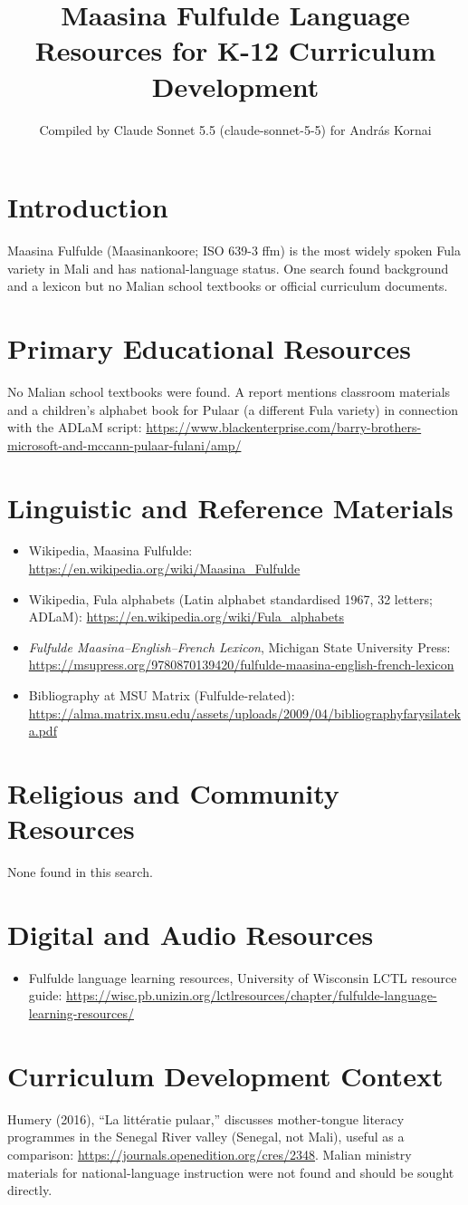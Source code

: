 \documentclass[12pt]{article}
\title{Maasina Fulfulde Language Resources for K-12 Curriculum Development}
\author{Compiled by Claude Sonnet 5.5 (claude-sonnet-5-5) for Andr\'as Kornai}
\date{}
\begin{document}
\maketitle
\section{Introduction}
Maasina Fulfulde (Maasinankoore; ISO 639-3 ffm) is the most widely spoken Fula variety in Mali and has national-language status. One search found background and a lexicon but no Malian school textbooks or official curriculum documents.
\section{Primary Educational Resources}
No Malian school textbooks were found. A report mentions classroom materials and a children's alphabet book for Pulaar (a different Fula variety) in connection with the ADLaM script: \url{https://www.blackenterprise.com/barry-brothers-microsoft-and-mccann-pulaar-fulani/amp/}
\section{Linguistic and Reference Materials}
\begin{itemize}
\item Wikipedia, Maasina Fulfulde: \url{https://en.wikipedia.org/wiki/Maasina_Fulfulde}
\item Wikipedia, Fula alphabets (Latin alphabet standardised 1967, 32 letters; ADLaM): \url{https://en.wikipedia.org/wiki/Fula_alphabets}
\item \textit{Fulfulde Maasina--English--French Lexicon}, Michigan State University Press: \url{https://msupress.org/9780870139420/fulfulde-maasina-english-french-lexicon}
\item Bibliography at MSU Matrix (Fulfulde-related): \url{https://alma.matrix.msu.edu/assets/uploads/2009/04/bibliographyfarysilateka.pdf}
\end{itemize}
\section{Religious and Community Resources}
None found in this search.
\section{Digital and Audio Resources}
\begin{itemize}
\item Fulfulde language learning resources, University of Wisconsin LCTL resource guide: \url{https://wisc.pb.unizin.org/lctlresources/chapter/fulfulde-language-learning-resources/}
\end{itemize}
\section{Curriculum Development Context}
Humery (2016), ``La litt\'eratie pulaar,'' discusses mother-tongue literacy programmes in the Senegal River valley (Senegal, not Mali), useful as a comparison: \url{https://journals.openedition.org/cres/2348}. Malian ministry materials for national-language instruction were not found and should be sought directly.
\end{document}
